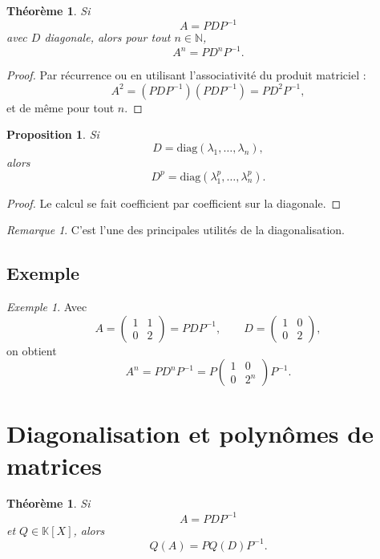 \documentclass[11pt,a4paper]{article}
\newtheorem{theoreme}[definition]{Théorème}
\newtheorem{proposition}[definition]{Proposition}
\theoremstyle{remark}
\newtheorem{remarque}[definition]{Remarque}
\newtheorem{exemple}[definition]{Exemple}
\newcommand{\N}{\mathbb{N}}
\newcommand{\K}{\mathbb{K}}
\newcommand{\diag}{\mathrm{diag}}
\begin{document}
\begin{theoreme}
Si
\[
A=PDP^{-1}
\]
avec \(D\) diagonale, alors pour tout \(n\in\N\),
\[
A^n=PD^nP^{-1}.
\]
\end{theoreme}

\begin{proof}
Par récurrence ou en utilisant l’associativité du produit matriciel :
\[
A^2=(PDP^{-1})(PDP^{-1})=PD^2P^{-1},
\]
et de même pour tout \(n\).
\end{proof}

\begin{proposition}
Si
\[
D=\diag(\lambda_1,\dots,\lambda_n),
\]
alors
\[
D^p=\diag(\lambda_1^p,\dots,\lambda_n^p).
\]
\end{proposition}

\begin{proof}
Le calcul se fait coefficient par coefficient sur la diagonale.
\end{proof}

\begin{remarque}
C’est l’une des principales utilités de la diagonalisation.
\end{remarque}

\subsection{Exemple}

\begin{exemple}
Avec
\[
A=
\begin{pmatrix}
1 & 1\\
0 & 2
\end{pmatrix}
=
PDP^{-1},
\qquad
D=
\begin{pmatrix}
1 & 0\\
0 & 2
\end{pmatrix},
\]
on obtient
\[
A^n=PD^nP^{-1}
=
P
\begin{pmatrix}
1 & 0\\
0 & 2^n
\end{pmatrix}
P^{-1}.
\]
\end{exemple}

\section{Diagonalisation et polynômes de matrices}

\begin{theoreme}
Si
\[
A=PDP^{-1}
\]
et \(Q\in\K[X]\), alors
\[
Q(A)=PQ(D)P^{-1}.
\]
\end{theoreme}
\end{document}
